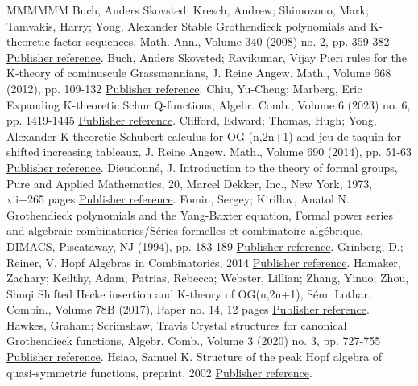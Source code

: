 \documentclass[11pt]{article}
\theoremstyle{definition}
\numberwithin{equation}{section}
\numberwithin{equation}{section}
\begin{document}
\begin{thebibliography}{MMMMMM}
 Buch, Anders Skovsted; Kresch, Andrew; Shimozono, Mark; Tamvakis, Harry; Yong, Alexander Stable Grothendieck polynomials and K-theoretic factor sequences, Math. Ann., Volume 340 (2008) no. 2, pp. 359-382 \href{https://alco.centre-mersenne.org/articles/10.5802/alco.362/#BKSTY}{Publisher reference}.
 Buch, Anders Skovsted; Ravikumar, Vijay Pieri rules for the K-theory of cominuscule Grassmannians, J. Reine Angew. Math., Volume 668 (2012), pp. 109-132 \href{https://alco.centre-mersenne.org/articles/10.5802/alco.362/#BuchRavikumar}{Publisher reference}.
 Chiu, Yu-Cheng; Marberg, Eric Expanding K-theoretic Schur Q-functions, Algebr. Comb., Volume 6 (2023) no. 6, pp. 1419-1445 \href{https://alco.centre-mersenne.org/articles/10.5802/alco.362/#ChiuMarberg}{Publisher reference}.
 Clifford, Edward; Thomas, Hugh; Yong, Alexander K-theoretic Schubert calculus for  OG (n,2n+1) and jeu de taquin for shifted increasing tableaux, J. Reine Angew. Math., Volume 690 (2014), pp. 51-63 \href{https://alco.centre-mersenne.org/articles/10.5802/alco.362/#CTY}{Publisher reference}.
 Dieudonné, J. Introduction to the theory of formal groups, Pure and Applied Mathematics, 20, Marcel Dekker, Inc., New York, 1973, xii+265 pages \href{https://alco.centre-mersenne.org/articles/10.5802/alco.362/#Dieudonne}{Publisher reference}.
 Fomin, Sergey; Kirillov, Anatol N. Grothendieck polynomials and the Yang-Baxter equation, Formal power series and algebraic combinatorics/Séries formelles et combinatoire algébrique, DIMACS, Piscataway, NJ (1994), pp. 183-189 \href{https://alco.centre-mersenne.org/articles/10.5802/alco.362/#FominKirillov94}{Publisher reference}.
 Grinberg, D.; Reiner, V. Hopf Algebras in Combinatorics, 2014 \href{https://alco.centre-mersenne.org/articles/10.5802/alco.362/#GrinbergReiner}{Publisher reference}.
 Hamaker, Zachary; Keilthy, Adam; Patrias, Rebecca; Webster, Lillian; Zhang, Yinuo; Zhou, Shuqi Shifted Hecke insertion and K-theory of OG(n,2n+1), Sém. Lothar. Combin., Volume 78B (2017), Paper no. 14, 12 pages \href{https://alco.centre-mersenne.org/articles/10.5802/alco.362/#HKPWZZ}{Publisher reference}.
 Hawkes, Graham; Scrimshaw, Travis Crystal structures for canonical Grothendieck functions, Algebr. Comb., Volume 3 (2020) no. 3, pp. 727-755 \href{https://alco.centre-mersenne.org/articles/10.5802/alco.362/#HawScr}{Publisher reference}.
 Hsiao, Samuel K. Structure of the peak Hopf algebra of quasi-symmetric functions, preprint, 2002 \href{https://alco.centre-mersenne.org/articles/10.5802/alco.362/#Hsiao}{Publisher reference}.

\end{thebibliography}
\end{document}
